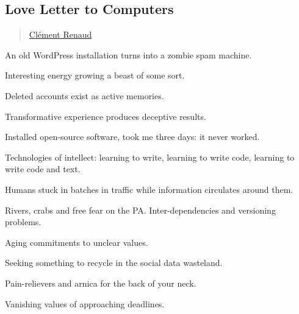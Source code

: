 \subsection{Love Letter to Computers}\label{love-letter-to-computers}

\begin{quote}
\hyperlink{clement-renaud}{Clément Renaud}
\end{quote}

An old WordPress installation turns into a zombie spam machine.

Interesting energy growing a beast of some sort.

Deleted accounts exist as active memories.

Transformative experience produces deceptive results.

Installed open-source software, took me three days: it never worked.

Technologies of intellect: learning to write, learning to write code,
learning to write code and text.

Humans stuck in batches in traffic while information circulates around
them.

Rivers, crabs and free fear on the PA. Inter-dependencies and versioning
problems.

Aging commitments to unclear values.

Seeking something to recycle in the social data wasteland.

Pain-relievers and arnica for the back of your neck.

Vanishing values of approaching deadlines.
